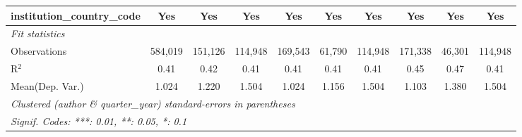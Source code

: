 \begin{tabular}{lccccccccc}
   institution\_country\_code             & Yes           & Yes           & Yes           & Yes           & Yes           & Yes           & Yes           & Yes           & Yes\\  
   \midrule
   \emph{Fit statistics}\\
   Observations                           & 584,019       & 151,126       & 114,948       & 169,543       & 61,790        & 114,948       & 171,338       & 46,301        & 114,948\\  
   R$^2$                                  & 0.41          & 0.42          & 0.41          & 0.41          & 0.41          & 0.41          & 0.45          & 0.47          & 0.41\\  
Mean(Dep. Var.) & 1.024 & 1.220 & 1.504 & 1.024 & 1.156 & 1.504 & 1.103 & 1.380 & 1.504 \\
   \midrule \midrule
   \multicolumn{10}{l}{\emph{Clustered (author \& quarter\_year) standard-errors in parentheses}}\\
   \multicolumn{10}{l}{\emph{Signif. Codes: ***: 0.01, **: 0.05, *: 0.1}}\\
\end{tabular}
\par\endgroup
